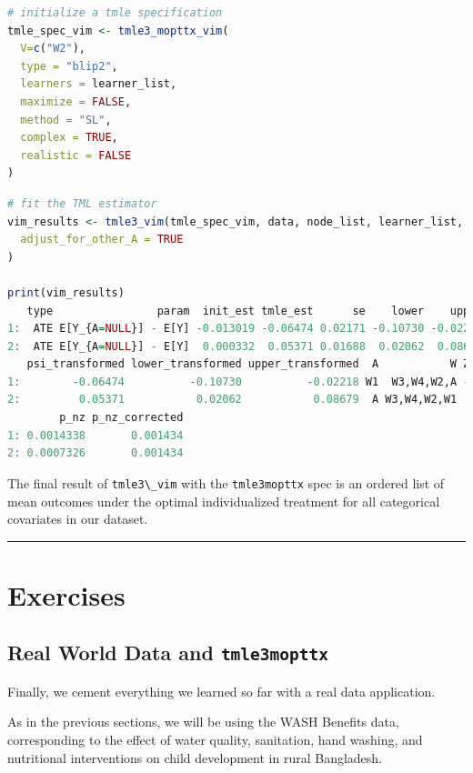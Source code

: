 \documentclass[
  12pt, krantz2,
]{krantz}
\newcommand{\passthrough}[1]{#1}
\newcommand{\1}{\mathbbm{1}}
\theoremstyle{definition}
\theoremstyle{definition}
\theoremstyle{definition}
\theoremstyle{definition}
\theoremstyle{remark}
\begin{document}
\begin{lstlisting}[language=R]
# initialize a tmle specification
tmle_spec_vim <- tmle3_mopttx_vim(
  V=c("W2"),
  type = "blip2",
  learners = learner_list,
  maximize = FALSE,
  method = "SL",
  complex = TRUE,
  realistic = FALSE
)
\end{lstlisting}

\begin{lstlisting}[language=R]
# fit the TML estimator
vim_results <- tmle3_vim(tmle_spec_vim, data, node_list, learner_list,
  adjust_for_other_A = TRUE
)

print(vim_results)
   type                param  init_est tmle_est      se    lower    upper
1:  ATE E[Y_{A=NULL}] - E[Y] -0.013019 -0.06474 0.02171 -0.10730 -0.02218
2:  ATE E[Y_{A=NULL}] - E[Y]  0.000332  0.05371 0.01688  0.02062  0.08679
   psi_transformed lower_transformed upper_transformed  A           W Z_stat
1:        -0.06474          -0.10730          -0.02218 W1  W3,W4,W2,A -2.982
2:         0.05371           0.02062           0.08679  A W3,W4,W2,W1  3.182
        p_nz p_nz_corrected
1: 0.0014338       0.001434
2: 0.0007326       0.001434
\end{lstlisting}

The final result of \passthrough{\lstinline!tmle3\_vim!} with the \passthrough{\lstinline!tmle3mopttx!} spec is an ordered list
of mean outcomes under the optimal individualized treatment for all categorical
covariates in our dataset.

\begin{center}\rule{0.5\linewidth}{0.5pt}\end{center}

\hypertarget{exercises-3}{%
\section{Exercises}\label{exercises-3}}

\hypertarget{real-world-data-and-tmle3mopttx}{%
\subsection{\texorpdfstring{Real World Data and \texttt{tmle3mopttx}}{Real World Data and tmle3mopttx}}\label{real-world-data-and-tmle3mopttx}}

Finally, we cement everything we learned so far with a real data application.

As in the previous sections, we will be using the WASH Benefits data,
corresponding to the effect of water quality, sanitation, hand washing, and
nutritional interventions on child development in rural Bangladesh.
\end{document}
